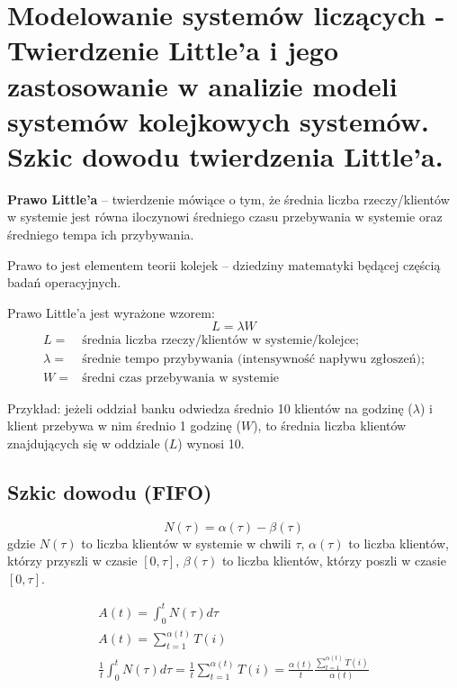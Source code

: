 \section{Modelowanie systemów liczących -
Twierdzenie Little'a i jego zastosowanie w analizie modeli systemów kolejkowych systemów.
Szkic dowodu twierdzenia Little'a.}

\textbf{Prawo Little’a} – twierdzenie mówiące o tym,
że średnia liczba rzeczy/klientów w systemie jest równa iloczynowi średniego czasu przebywania w systemie
oraz średniego tempa ich przybywania.

Prawo to jest elementem teorii kolejek – dziedziny matematyki będącej częścią badań operacyjnych.

Prawo Little’a jest wyrażone wzorem:
\[
    L = \lambda W
\]
\begin{align*}
    L = & \text{średnia liczba rzeczy/klientów w systemie/kolejce;}\\
    \lambda = & \text{średnie tempo przybywania (intensywność napływu zgłoszeń);}\\
    W = & \text{średni czas przebywania w systemie}
\end{align*}

Przykład: jeżeli oddział banku odwiedza średnio 10 klientów na godzinę ($\lambda$)
i klient przebywa w nim średnio 1 godzinę ($W$),
to średnia liczba klientów znajdujących się w oddziale ($L$) wynosi 10.

\subsection{Szkic dowodu (FIFO)}

\[
    N(\tau)=\alpha(\tau)-\beta(\tau)
\]
gdzie $N(\tau)$ to liczba klientów w systemie w chwili $\tau$,
$\alpha(\tau)$ to liczba klientów, którzy przyszli w czasie $[0, \tau]$,
$\beta(\tau)$ to liczba klientów, którzy poszli w czasie $[0, \tau]$.

\begin{gather*}
    A(t)=\int_0^t N(\tau) d\tau\\
    A(t)=\sum_{t=1}^{\alpha(t)} T(i)\\
    \frac{1}{t}\int_0^t N(\tau) d\tau=\frac{1}{t}\sum_{t=1}^{\alpha(t)} T(i)=\frac{\alpha(t)}{t}\frac{\sum_{t=1}^{\alpha(t)} T(i)}{\alpha(t)}\\
\end{gather*}


